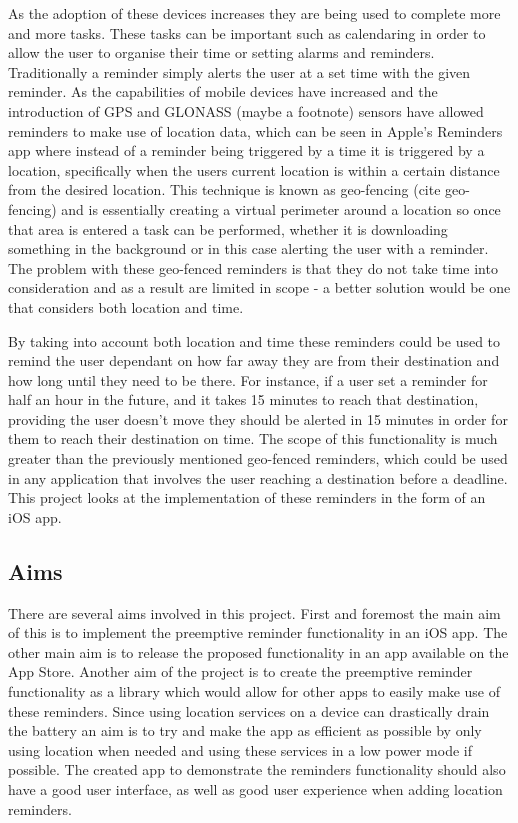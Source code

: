 \documentclass[12pt]{report}
\begin{document}
As the adoption of these devices increases they are being used to complete more and more tasks. These tasks can be important such as calendaring in order to allow the user to organise their time or setting alarms and reminders. Traditionally a reminder simply alerts the user at a set time with the given reminder. As the capabilities of mobile devices have increased and the introduction of GPS and GLONASS (maybe a footnote) sensors have allowed reminders to make use of location data, which can be seen in Apple's Reminders app where instead of a reminder being triggered by a time it is triggered by a location, specifically when the users current location is within a certain distance from the desired location. This technique is known as geo-fencing (cite geo-fencing) and is essentially creating a virtual perimeter around a location so once that area is entered a task can be performed, whether it is downloading something in the background or in this case alerting the user with a reminder. The problem with these geo-fenced reminders is that they do not take time into consideration and as a result are limited in scope - a better solution would be one that considers both location and time. 

By taking into account both location and time these reminders could be used to remind the user dependant on how far away they are from their destination and how long until they need to be there. For instance, if a user set a reminder for half an hour in the future, and it takes 15 minutes to reach that destination, providing the user doesn't move they should be alerted in 15 minutes in order for them to reach their destination on time. The scope of this functionality is much greater than the previously mentioned geo-fenced reminders, which could be used in any application that involves the user reaching a destination before a deadline. This project looks at the implementation of these reminders in the form of an iOS app.

\subsection{Aims}

There are several aims involved in this project. First and foremost the main aim of this is to implement the preemptive reminder functionality in an iOS app. The other main aim is to release the proposed functionality in an app available on the App Store. Another aim of the project is to create the preemptive reminder functionality as a library which would allow for other apps to easily make use of these reminders. Since using location services on a device can drastically drain the battery an aim is to try and make the app as efficient as possible by only using location when needed and using these services in a low power mode if possible. The created app to demonstrate the reminders functionality should also have a good user interface, as well as good user experience when adding location reminders.
\end{document}
